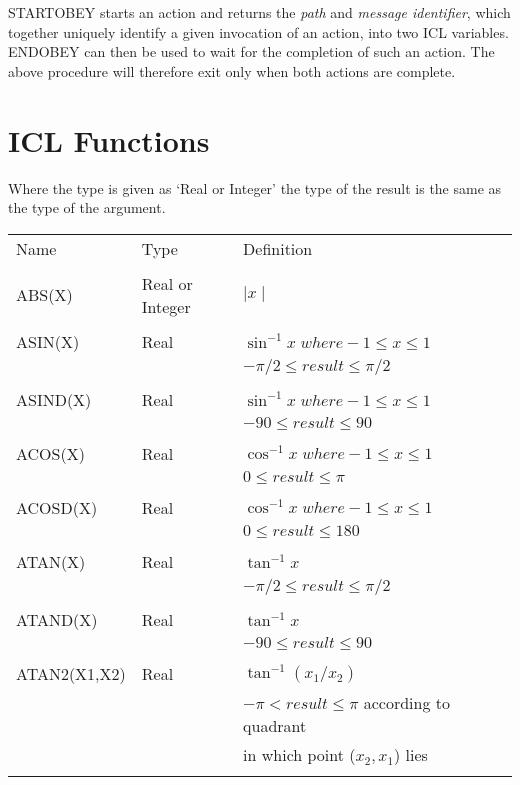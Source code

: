\documentclass[twoside,11pt,nolof,chapters]{starlink}
\begin{document}
STARTOBEY starts an action and returns the \emph{path} and \emph{message
identifier}, which together uniquely identify a given invocation of an action,
into two ICL variables. ENDOBEY can then be used to wait for the completion
of such an action. The above procedure will therefore exit only when both
actions are complete.

\appendix
\chapter{ICL Functions}

Where the type is given as `Real or Integer' the type of the result is the
same as the type of the argument.
\begin{center}
\begin{tabular}{llll}

Name & Type & Definition \\
\\
ABS(X) & Real or Integer & $\mid x \mid$\\
\\
ASIN(X) & Real & $\sin^{-1} x \; where -1 \leq x \leq 1 $\\
   &  &  $ -\pi/2 \leq result \leq \pi/2$\\
\\
ASIND(X) & Real & $\sin^{-1} x \; where -1 \leq x \leq 1 $\\
   &  &  $ -90 \leq result \leq 90$\\
\\
ACOS(X) & Real & $\cos^{-1} x \; where -1 \leq x \leq 1 $\\
   &  &  $ 0 \leq result \leq \pi$\\
\\
ACOSD(X) & Real & $\cos^{-1} x \; where -1 \leq x \leq 1 $\\
   &  &  $ 0 \leq result \leq 180$\\
\\
ATAN(X) & Real & $\tan^{-1} x $ \\
   &  &  $ -\pi/2 \leq result \leq \pi/2$\\
\\
ATAND(X) & Real & $\tan^{-1} x $ \\
   &  &  $ -90 \leq result \leq 90$\\
\\
ATAN2(X1,X2) & Real & $\tan^{-1} (x_{1}/x_{2}) $\\
   & & $ -\pi < result \leq \pi $ according to quadrant \\
   & & in which point ($x_{2},x_{1}$) lies\\
\\
\end{tabular}
\end{center}
\end{document}
